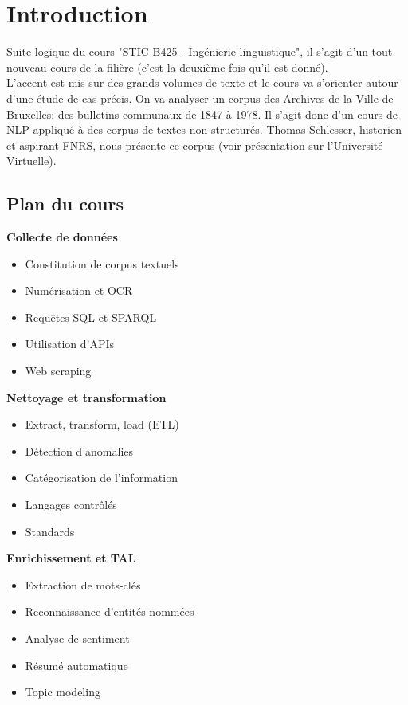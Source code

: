 \vspace{-1.2cm}

\section{Introduction}

Suite logique du cours "STIC-B425 - Ingénierie linguistique", il s'agit d'un tout nouveau cours
de la filière (c'est la deuxième fois qu'il est donné).\\

L'accent est mis sur des grands volumes de texte et le cours va s'orienter autour d'une étude de cas précis.
On va analyser un corpus des Archives de la Ville de Bruxelles: des bulletins communaux de 1847 à 1978.
Il s'agit donc d'un cours de NLP appliqué à des corpus de textes non structurés.
Thomas Schlesser, historien et aspirant FNRS, nous présente ce corpus (voir présentation sur l'Université Virtuelle).\\

\subsection{Plan du cours}

\noindent\textbf{Collecte de données}
\begin{itemize}
\item Constitution de corpus textuels
\item Numérisation et OCR
\item Requêtes SQL et SPARQL
\item Utilisation d'APIs
\item Web scraping\\
\end{itemize}

\noindent\textbf{Nettoyage et transformation}
\begin{itemize}
\item Extract, transform, load (ETL)
\item Détection d'anomalies
\item Catégorisation de l'information
\item Langages contrôlés
\item Standards\\
\end{itemize}

\noindent\textbf{Enrichissement et TAL}
\begin{itemize}
\item Extraction de mots-clés
\item Reconnaissance d'entités nommées
\item Analyse de sentiment
\item Résumé automatique
\item Topic modeling\\
\end{itemize}

